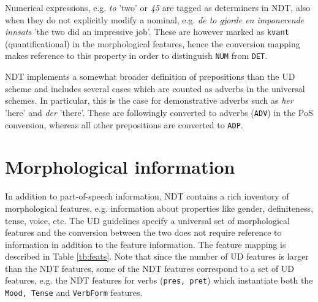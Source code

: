 \documentclass[10pt, a4paper]{article}
\begin{document}
Numerical expressions, e.g. {\it to} 'two' or {\it 45} are tagged as
determiners in NDT, also when they do not explicitly modify a nominal,
e.g. {\it de to gjorde en imponerende innsats} 'the two did an
impressive job'. These are however marked as {\tt kvant}
(quantificational) in the morphological features, hence the conversion
mapping makes reference to this property in order to distinguish {\tt NUM} from {\tt DET}.

NDT implements a somewhat broader definition of prepositions than the UD
scheme and includes several cases which are counted as adverbs in the
universal schemes. In particular, this is the case for demonstrative
adverbs such as {\it her} 'here' and {\it der} 'there'. These are
followingly converted to adverbs ({\tt ADV}) in the PoS conversion, whereas all
other prepositions are converted to {\tt ADP}.

\section{Morphological information}
In addition to part-of-speech information, NDT contains a rich
inventory of morphological features, e.g. information about properties
like gender, definiteness, tense, voice, etc. The UD guidelines
specify a universal set of morphological features and the conversion
between the two does not require reference to
information in addition to the feature information. The feature
mapping is described in Table \ref{tb:feats}.  Note that since the
number of UD features is larger than the NDT features, some of the NDT
features correspond to a set of UD features, e.g. the NDT features for
verbs ({\tt pres, pret}) which instantiate both the {\tt Mood, Tense}
and {\tt VerbForm} features.

\end{document}
